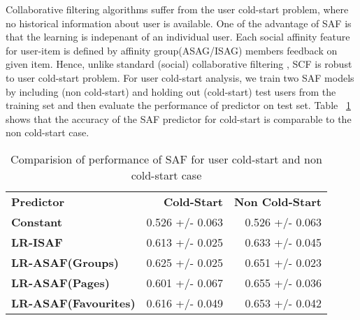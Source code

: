 Collaborative filtering algorithms suffer from the user cold-start problem,
where no historical information about user is available. One of the advantage of SAF is that 
the learning is indepenant of an individual user. Each social affinity feature for user-item is
defined by affinity group(ASAG/ISAG) members feedback on given item. 
Hence, unlike standard (social) collaborative filtering , SCF is robust to user 
cold-start problem.  For user cold-start analysis, we train two SAF models by 
including (non cold-start) and holding out (cold-start) test users from the 
training set and then evaluate the performance of predictor on test set. 
Table ~\ref{tab:coldstart} shows that the accuracy of the SAF predictor for 
cold-start is comparable to the non cold-start case.  

\begin{table}[t!]
\centering
\begin{tabular}{|>{\small}l|>{\small}r|>{\small}r|}
\hline
& \multicolumn{2}{|c|}{\textbf{Accuracy}}\\
\hline
\textbf{Predictor}& \textbf{Cold-Start} & \textbf{Non Cold-Start}\\
\hline
\textbf{Constant} & 0.526  +/-  0.063 & 0.526  +/-  0.063 \\
\hline
\textbf{LR-ISAF} & 0.613 +/- 0.025 & 0.633  +/-  0.045 \\
\hline
\textbf{LR-ASAF(Groups)} & 0.625  +/-  0.025 & 0.651  +/-  0.023 \\
\hline
\textbf{LR-ASAF(Pages)} & 0.601  +/-  0.067 & 0.655  +/-  0.036 \\
\hline
\textbf{LR-ASAF(Favourites)} & 0.616  +/-  0.049 & 0.653  +/-  0.042\\
\hline
\end{tabular}
\caption{Comparision of performance of SAF for user cold-start and non cold-start case}
\label{tab:coldstart}
\end{table}